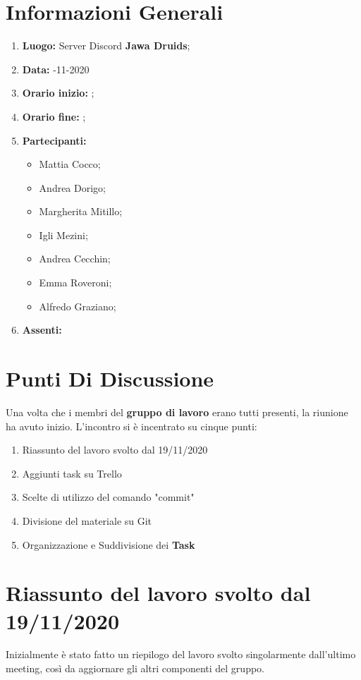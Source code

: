 \newpage
	\chapter{Informazioni Generali}
	\begin{enumerate}
		\item \textbf{Luogo:} \normalfont Server Discord \textbf{Jawa Druids};
		\item \textbf{Data:} -11-2020
		\item \textbf{Orario inizio:} ;
		\item \textbf{Orario fine:} ;
		\item \textbf{Partecipanti:}
		\begin{itemize}
			\item Mattia Cocco;
			\item Andrea Dorigo;
			\item Margherita Mitillo;
			\item Igli Mezini;
			\item Andrea Cecchin;
			\item Emma Roveroni;
			\item Alfredo Graziano;
		\end{itemize}
		\item \textbf{Assenti:}
	\end{enumerate}
	\newpage
	\chapter{Punti Di Discussione}	
	Una volta che i membri del \textbf{gruppo di lavoro} erano tutti presenti, la riunione ha avuto inizio.
	L'incontro si è incentrato su cinque punti:
	\begin{enumerate}
		\item Riassunto del lavoro svolto dal 19/11/2020
		\item Aggiunti task su Trello
		\item Scelte di utilizzo del comando "commit"
		\item Divisione del materiale su Git
		\item Organizzazione e Suddivisione dei \textbf{Task}
	\end{enumerate}
	
	\chapter{Riassunto del lavoro svolto dal 19/11/2020}
	Inizialmente è stato fatto un riepilogo del lavoro svolto singolarmente dall'ultimo meeting, così da aggiornare gli altri componenti del gruppo.
	
